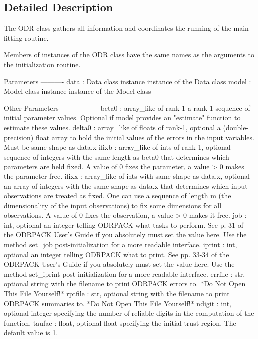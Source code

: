 \subsection{Detailed Description}
\begin{DoxyVerb}The ODR class gathers all information and coordinates the running of the
main fitting routine.

Members of instances of the ODR class have the same names as the arguments
to the initialization routine.

Parameters
----------
data : Data class instance
    instance of the Data class
model : Model class instance
    instance of the Model class

Other Parameters
----------------
beta0 : array_like of rank-1
    a rank-1 sequence of initial parameter values. Optional if
    model provides an "estimate" function to estimate these values.
delta0 : array_like of floats of rank-1, optional
    a (double-precision) float array to hold the initial values of
    the errors in the input variables. Must be same shape as data.x
ifixb : array_like of ints of rank-1, optional
    sequence of integers with the same length as beta0 that determines
    which parameters are held fixed. A value of 0 fixes the parameter,
    a value > 0 makes the parameter free.
ifixx : array_like of ints with same shape as data.x, optional
    an array of integers with the same shape as data.x that determines
    which input observations are treated as fixed. One can use a sequence
    of length m (the dimensionality of the input observations) to fix some
    dimensions for all observations. A value of 0 fixes the observation,
    a value > 0 makes it free.
job : int, optional
    an integer telling ODRPACK what tasks to perform. See p. 31 of the
    ODRPACK User's Guide if you absolutely must set the value here. Use the
    method set_job post-initialization for a more readable interface.
iprint : int, optional
    an integer telling ODRPACK what to print. See pp. 33-34 of the
    ODRPACK User's Guide if you absolutely must set the value here. Use the
    method set_iprint post-initialization for a more readable interface.
errfile : str, optional
    string with the filename to print ODRPACK errors to. *Do Not Open
    This File Yourself!*
rptfile : str, optional
    string with the filename to print ODRPACK summaries to. *Do Not
    Open This File Yourself!*
ndigit : int, optional
    integer specifying the number of reliable digits in the computation
    of the function.
taufac : float, optional
    float specifying the initial trust region. The default value is 1.

\end{DoxyVerb}
